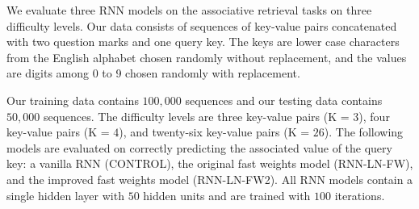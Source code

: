 \documentclass[portrait,a0b,final,a4resizeable]{include/a0poster}
\begin{document}
\begin{poster}
\begin{multicols}{3}
% 
We evaluate three RNN models on the associative retrieval tasks on three difficulty levels.
Our data consists of sequences of key-value pairs concatenated with two question marks and one query key.
The keys are lower case characters from the English alphabet chosen randomly without replacement, and the values are digits among 0 to 9 chosen randomly with replacement. \\

\begin{minipage}[c]{1\columnwidth}
        \centering
		\label{table:examples}
\end{minipage}
\vspace{0.25in}

Our training data contains $100,000$ sequences and our testing data contains $50,000$ sequences.
The difficulty levels are three key-value pairs (K = $3$), four key-value pairs (K = $4$), and twenty-six key-value pairs (K = $26$).
The following models are evaluated on correctly predicting the associated value of the query key: a vanilla RNN (CONTROL), the original fast weights model (RNN-LN-FW), and the improved fast weights model (RNN-LN-FW2).
All RNN models contain a single hidden layer with $50$ hidden units and are trained with $100$ iterations.\\

\begin{minipage}[c]{1\columnwidth}
        \centering
		\label{table:compare_methods}
\end{minipage}


\end{multicols}
\end{poster}
\end{document}
